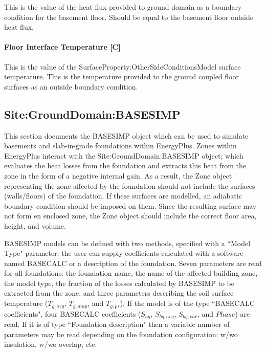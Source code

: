 This is the value of the heat flux provided to ground domain as a boundary condition for the basement floor. Should be equal to the basement floor outside heat flux.

\paragraph{Floor Interface Temperature {[}C{]}}\label{floor-interface-temperature-c}

This is the value of the SurfaceProperty:OtherSideConditionsModel surface temperature. This is the temperature provided to the ground coupled floor surfaces as an outside boundary condition.



\subsection{Site:GroundDomain:BASESIMP}\label{sitegrounddomainbasesimp}

This section documents the BASESIMP object which can be used to simulate basements and slab-in-grade foundations within EnergyPlus. Zones within EnergyPlus interact with the Site:GroundDomain:BASESIMP object; which evaluates the heat losses from the foundation and extracts this heat from the zone in the form of a negative internal gain. As a result, the Zone object representing the zone affected by the foundation should not include the surfaces (walls/floors) of the foundation.  If these surfaces are modelled, an adiabatic boundary condition should be imposed on them.  Since the resulting surface may not form en enclosed zone, the Zone object should include the correct floor area, height, and volume.

BASESIMP models can be defined with two methods, specified with a ``Model Type" parameter: the user can supply coefficients calculated with a software named BASECALC or a description of the foundation.  Seven parameters are read for all foundations: the foundation name, the name of the affected building zone, the model type, the fraction of the losses calculated by BASESIMP to be extracted from the zone, and three parameters describing the soil surface temperature ($T_{g,avg}$, $T_{g,amp}$, and $T_{g,ps}$).  If the model is of the type ``BASECALC coefficients", four BASECALC coefficients ($S_{ag}$, $S_{bg, avg}$, $S_{bg, var}$, and $Phase$) are read.  If it is of type ``Foundation description" then a variable number of parameters may be read depending on the foundation configuration: w/wo insulation, w/wo overlap, etc.


